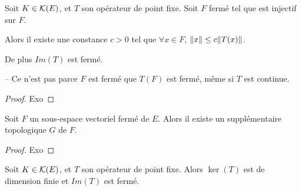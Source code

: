 \begin{proposition}
	\label{prop:fixe_point_closed_injective}
	Soit $K \in \mathcal{K}(E)$, et $T$ son opérateur de point fixe. Soit $F$
	fermé tel que  est injectif sur $F$.

	Alors il existe une constance $c > 0$ tel que $\forall x \in F$, $\norm{x}
	\leq c \norm{T(x)}$.

	De plus $Im(T)$ est fermé.
\end{proposition}

\begin{remarque}
	-- Ce n'est pas parce $F$ est fermé que $T(F)$ est fermé, même si $T$ est
	continue.
\end{remarque}

\begin{proof}
	Exo
\end{proof}

\begin{proposition}
	\label{prop:supplementaire_sev_ferme}
	Soit $F$ un sous-espace vectoriel fermé de $E$. Alors il existe un
	supplémentaire topologique $G$ de $F$.
\end{proposition}

\begin{proof}
	Exo
\end{proof}

\begin{proposition}
	Soit $K \in \mathcal{K}(E)$, et $T$ son opérateur de point fixe. Alors
	$\ker(T)$ est de dimension finie et $Im(T)$ est fermé.
\end{proposition}

